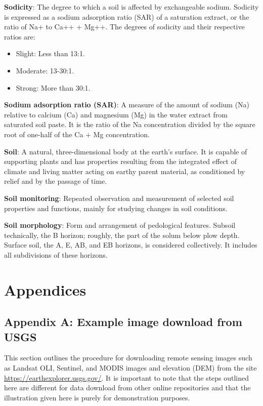 \documentclass[
  10pt,
  b5paper,
]{book}
\providecommand{\tightlist}{%
  \setlength{\itemsep}{0pt}\setlength{\parskip}{0pt}}
\begin{document}
\textbf{Sodicity}: The degree to which a soil is affected by exchangeable sodium. Sodicity is expressed as a sodium adsorption ratio (SAR) of a saturation extract, or the ratio of Na+ to Ca++ + Mg++. The degrees of sodicity and their respective ratios are:

\begin{itemize}
\tightlist
\item
  Slight: Less than 13:1.
\item
  Moderate: 13-30:1.
\item
  Strong: More than 30:1.
\end{itemize}

\textbf{Sodium adsorption ratio (SAR)}: A measure of the amount of sodium (Na) relative to calcium (Ca) and magnesium (Mg) in the water extract from saturated soil paste. It is the ratio of the Na concentration divided by the square root of one-half of the Ca + Mg concentration.

\textbf{Soil}: A natural, three-dimensional body at the earth's surface. It is capable of supporting plants and has properties resulting from the integrated effect of climate and living matter acting on earthy parent material, as conditioned by relief and by the passage of time.

\textbf{Soil monitoring}: Repeated observation and measurement of selected soil properties and functions, mainly for studying changes in soil conditions.

\textbf{Soil morphology}: Form and arrangement of pedological features. Subsoil technically, the B horizon; roughly, the part of the solum below plow depth. Surface soil, the A, E, AB, and EB horizons, is considered collectively. It includes all subdivisions of these horizons.

\hypertarget{appendices}{%
\chapter*{Appendices}\label{appendices}}

\hypertarget{appendix-a-example-image-download-from-usgs}{%
\section*{Appendix A: Example image download from USGS}\label{appendix-a-example-image-download-from-usgs}}

This section outlines the procedure for downloading remote sensing images such as Landsat OLI, Sentinel, and MODIS images and elevation (DEM) from the site \url{https://earthexplorer.usgs.gov/}. It is important to note that the steps outlined here are different for data download from other online repositories and that the illustration given here is purely for demonstration purposes.
\end{document}
